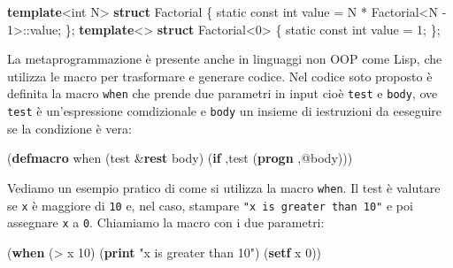 \documentclass[
  letterpaper,
]{scrbook}
\newenvironment{Shaded}{\begin{snugshade}}{\end{snugshade}}
\newcommand{\AttributeTok}[1]{\textcolor[rgb]{0.40,0.45,0.13}{#1}}
\newcommand{\DataTypeTok}[1]{\textcolor[rgb]{0.68,0.00,0.00}{#1}}
\newcommand{\DecValTok}[1]{\textcolor[rgb]{0.68,0.00,0.00}{#1}}
\newcommand{\FunctionTok}[1]{\textcolor[rgb]{0.28,0.35,0.67}{#1}}
\newcommand{\KeywordTok}[1]{\textcolor[rgb]{0.00,0.23,0.31}{\textbf{#1}}}
\newcommand{\NormalTok}[1]{\textcolor[rgb]{0.00,0.23,0.31}{#1}}
\newcommand{\OperatorTok}[1]{\textcolor[rgb]{0.37,0.37,0.37}{#1}}
\newcommand{\StringTok}[1]{\textcolor[rgb]{0.13,0.47,0.30}{#1}}
\begin{document}
\begin{Shaded}
\begin{Highlighting}[]
\KeywordTok{template}\OperatorTok{\textless{}}\DataTypeTok{int}\NormalTok{ N}\OperatorTok{\textgreater{}}
\KeywordTok{struct}\NormalTok{ Factorial }\OperatorTok{\{}
    \AttributeTok{static} \AttributeTok{const} \DataTypeTok{int}\NormalTok{ value }\OperatorTok{=}\NormalTok{ N }\OperatorTok{*}\NormalTok{ Factorial}\OperatorTok{\textless{}}\NormalTok{N }\OperatorTok{{-}} \DecValTok{1}\OperatorTok{\textgreater{}::}\NormalTok{value}\OperatorTok{;}
\OperatorTok{\};}
\KeywordTok{template}\OperatorTok{\textless{}\textgreater{}}
\KeywordTok{struct}\NormalTok{ Factorial}\OperatorTok{\textless{}}\DecValTok{0}\OperatorTok{\textgreater{}} \OperatorTok{\{}
    \AttributeTok{static} \AttributeTok{const} \DataTypeTok{int}\NormalTok{ value }\OperatorTok{=} \DecValTok{1}\OperatorTok{;}
\OperatorTok{\};}
\end{Highlighting}
\end{Shaded}

La metaprogrammazione è presente anche in linguaggi non OOP come Lisp,
che utilizza le macro per trasformare e generare codice. Nel codice soto
proposto è definita la macro \texttt{when} che prende due parametri in
input cioè \texttt{test} e \texttt{body}, ove \texttt{test} è
un'espressione comdizionale e \texttt{body} un insieme di iestruzioni da
eeseguire se la condizione è vera:

\begin{Shaded}
\begin{Highlighting}[]
\NormalTok{(}\KeywordTok{defmacro}\FunctionTok{ when }\NormalTok{(test \&}\KeywordTok{rest}\NormalTok{ body)}
\NormalTok{  \textasciigrave{}(}\KeywordTok{if}\NormalTok{ ,test}
\NormalTok{       (}\KeywordTok{progn}\NormalTok{ ,@body)))}
\end{Highlighting}
\end{Shaded}

Vediamo un esempio pratico di come si utilizza la macro \texttt{when}.
Il test è valutare se \texttt{x} è maggiore di \texttt{10} e, nel caso,
stampare \texttt{"x\ is\ greater\ than\ 10"} e poi assegnare \texttt{x}
a \texttt{0}. Chiamiamo la macro con i due parametri:

\begin{Shaded}
\begin{Highlighting}[]
\NormalTok{(}\KeywordTok{when}\NormalTok{ (}\OperatorTok{\textgreater{}}\NormalTok{ x }\DecValTok{10}\NormalTok{)}
\NormalTok{  (}\KeywordTok{print} \StringTok{"x is greater than 10"}\NormalTok{)}
\NormalTok{  (}\KeywordTok{setf}\NormalTok{ x }\DecValTok{0}\NormalTok{))}
\end{Highlighting}
\end{Shaded}
\end{document}
